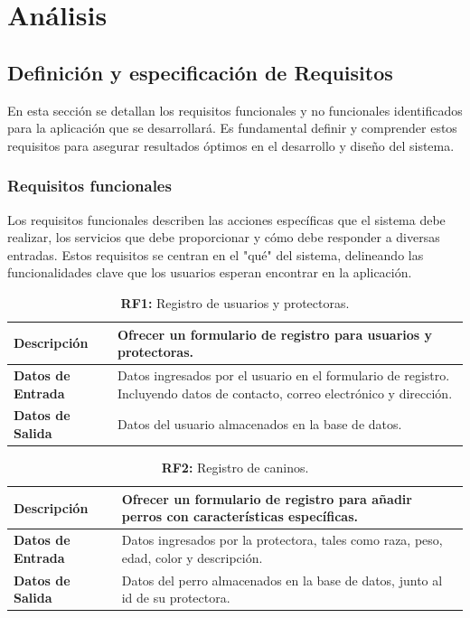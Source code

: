 \documentclass[a4paper, 12pt]{article}
\begin{document}
\newpage
\section{Análisis}

\subsection{Definición y especificación de Requisitos}

En esta sección se detallan los requisitos funcionales y no funcionales identificados para la aplicación que se desarrollará. Es fundamental definir y comprender estos requisitos para asegurar resultados óptimos en el desarrollo y diseño del sistema.

\subsubsection{Requisitos funcionales}

Los requisitos funcionales describen las acciones específicas que el sistema debe realizar, los servicios que debe proporcionar y cómo debe responder a diversas entradas. Estos requisitos se centran en el "qué" del sistema, delineando las funcionalidades clave que los usuarios esperan encontrar en la aplicación.

\begin{table}[H]
\captionsetup{justification=raggedright,singlelinecheck=false}
\caption{\textbf{RF1:} Registro de usuarios y protectoras.}
\label{tab:RF1}
	\begin{tabular}{|m{5cm}|m{10cm}|}
	\hline
	\textbf{Descripción} & Ofrecer un formulario de registro para usuarios y protectoras. \\ 
	\hline
	\textbf{Datos de Entrada} & Datos ingresados por el usuario en el formulario de registro. Incluyendo datos de contacto, correo electrónico y dirección. \\ 
	\hline
	\textbf{Datos de Salida} & Datos del usuario almacenados en la base de datos. \\ 
	\hline
\end{tabular}
\end{table}

\begin{table}[H]
\captionsetup{justification=raggedright,singlelinecheck=false}
\caption{\textbf{RF2:} Registro de caninos.}
\label{tab:RF2}
	\begin{tabular}{|m{5cm}|m{10cm}|}
	\hline
	\textbf{Descripción} & Ofrecer un formulario de registro para añadir perros con características específicas. \\ 
	\hline
	\textbf{Datos de Entrada} & Datos ingresados por la protectora, tales como raza, peso, edad, color y descripción. \\ 
	\hline
	\textbf{Datos de Salida} & Datos del perro almacenados en la base de datos, junto al id de su protectora. \\ 
	\hline
\end{tabular}
\end{table}
\end{document}
